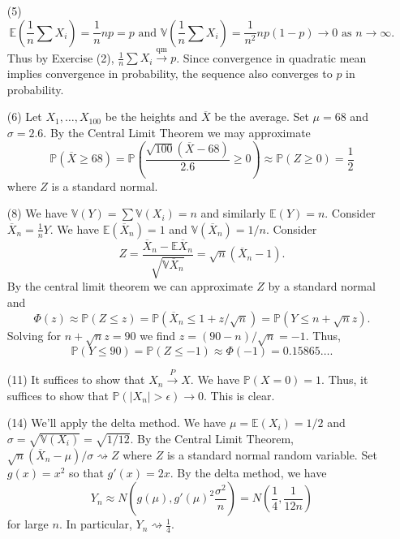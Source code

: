 \documentclass[10pt]{article}
\renewcommand{\P}{\mathbb{P}}
\newcommand{\V}{\mathbb{V}}
\newcommand{\E}{\mathbb{E}}
\newcommand{\toP}{\xrightarrow{P}}
\newcommand{\toqm}{\xrightarrow{\text{qm}}}
\begin{document}
\begin{enumerate}
\item[(5)]
\[
\E\left(\frac{1}{n}\sum X_i\right) = \frac{1}{n}np = p \text{ and }
\V\left(\frac{1}{n}\sum X_i\right) = \frac{1}{n^2}np(1-p)\to 0
\text{ as } n\to \infty.
\]
Thus by Exercise (2), $\frac{1}{n}\sum X_i\toqm p$. Since convergence in quadratic
mean implies convergence in probability, the sequence also converges to $p$
in probability.

\item[(6)]
Let $X_1,\ldots,X_{100}$ be the heights and $\overline X$ be the average.
Set $\mu=68$ and $\sigma=2.6$.
By the Central Limit Theorem we may approximate
\[
\P(\overline X \geq 68) =
\P\left(\frac{\sqrt{100}(\overline X - 68)}{2.6} \geq 0\right) \approx
\P(Z\geq 0) = \frac{1}{2}
\]
where $Z$ is a standard normal.

\item[(8)]
We have $\V(Y)=\sum \V(X_i)=n$ and similarly $\E(Y)=n$.
Consider $\overline X_n=\frac{1}{n}Y$. We have $\E(\overline X_n)=1$
and $\V(\overline X_n)=1/n$. Consider
\[
Z = \frac{\overline X_n - \E \overline X_n}{\sqrt{\V \overline X_n}}
= \sqrt{n}(\overline X_n -1).
\]
By the central limit theorem we can approximate $Z$ by a standard normal and
\[
\Phi(z) \approx \P(Z\leq z) = \P(\overline X_n \leq 1 + z/\sqrt{n})
= \P(Y \leq n + \sqrt{n}z).
\]
Solving for $n+\sqrt{n}z=90$ we find $z=(90-n)/\sqrt{n}=-1$. Thus,
\[
\P(Y\leq 90) = \P(Z\leq -1) \approx \Phi(-1) = 0.15865\ldots.
\]

\item[(11)]
It suffices to show that $X_n\toP X$. We have $\P(X=0)=1$.
Thus, it suffices to show that $\P(|X_n|>\epsilon)\to 0$. This is clear.

\item[(14)]
We'll apply the delta method. We have $\mu=\E(X_i)=1/2$ and
$\sigma=\sqrt{\V(X_i)}=\sqrt{1/12}$. By the Central Limit Theorem,
$\sqrt{n}(\overline X_n - \mu)/\sigma\rightsquigarrow Z$ where $Z$ is a
standard normal random variable. Set $g(x)=x^2$ so that $g'(x)=2x$.
By the delta method, we have
\[
Y_n \approx N\left(g(\mu), g'(\mu)^2 \frac{\sigma^2}{n}\right) =
N\left(\frac{1}{4}, \frac{1}{12n}\right)
\]
for large $n$. In particular, $Y_n \rightsquigarrow \frac{1}{4}$.


\end{enumerate}
\end{document}
